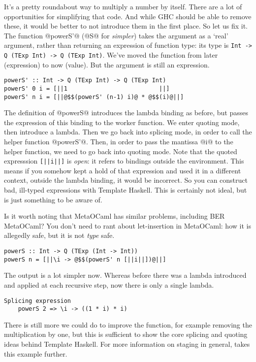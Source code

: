 It's a pretty roundabout way to multiply a number by itself. There are a lot of opportunities for simplifying that code. And while GHC should be able to remove these, it would be better to not introduce them in the first place.
So let us fix it.
The function @powerS'@ (@S@ for \emph{simpler}) takes the argument as a `real' argument, rather than returning an expression of function type: its type is \lstinline/Int -> Q (TExp Int) -> Q (TExp Int)/.
We've moved the function from later (expression) to now (value).
But the argument is still an expression.

\begin{lstlisting}
powerS' :: Int -> Q (TExp Int) -> Q (TExp Int)
powerS' 0 i = [||1                          ||]
powerS' n i = [||@$$(powerS' (n-1) i)@ * @$$(i)@||]
\end{lstlisting}

The definition of @powerS@ introduces the lambda binding as before, but passes the expression of this binding to the worker function.
We enter quoting mode, then introduce a lambda. Then we go back into splicing mode, in order to call the helper function @powerS'@.
Then, in order to pass the mantissa @i@ to the helper function, we need to go back into quoting mode.
Note that the quoted expresssion \lstinline/[||i||]/ is \emph{open}: it refers to bindings outside the environment.
This means if you somehow kept a hold of that expression and used it in a different context, outside the lambda binding, it would be incorrect.
So you can construct bad, ill-typed expressions with Template Haskell. This is certainly not ideal, but is just something to be aware of.

Is it worth noting that MetaOCaml has similar problems, including BER MetaOCaml?
You don't need to rant about let-insertion in MetaOCaml: how it is allegedly safe, but it is not \emph{type} safe.

\begin{lstlisting}
powerS :: Int -> Q (TExp (Int -> Int))
powerS n = [||\i -> @$$(powerS' n [||i||])@||]
\end{lstlisting}

The output is a lot simpler now.
Whereas before there was a lambda introduced and applied at each recursive step, now there is only a single lambda.

\begin{lstlisting}
Splicing expression
    powerS 2 => \i -> ((1 * i) * i)
\end{lstlisting}

There is still more we could do to improve the function, for example removing the multiplication by one, but this is sufficient to show the core splicing and quoting ideas behind Template Haskell.
For more information on staging in general, \citet{rompf2010lightweight} takes this example further.

